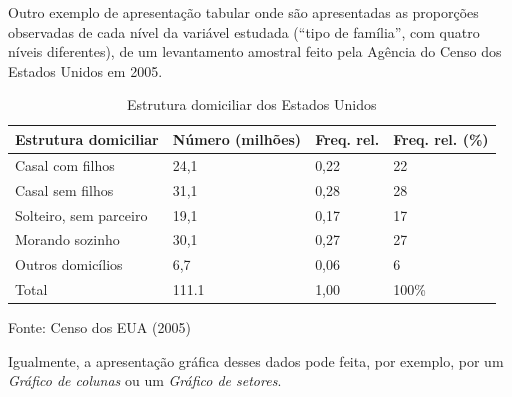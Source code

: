\documentclass[
]{book}
\begin{document}
\hfill\break

Outro exemplo de apresentação tabular onde são apresentadas as proporções observadas de cada nível da variável estudada (``tipo de família'', com quatro níveis diferentes), de um levantamento amostral feito pela Agência do Censo dos Estados Unidos em 2005.

\hfill\break

\begin{table}[h]
\centering
\caption{Estrutura domiciliar dos Estados Unidos}
\begin{tabular}{|l|l|l|l|}
\hline
Estrutura domiciliar   & Número (milhões)  & Freq. rel.  & Freq. rel.  (\%) \\
\hline
Casal com filhos       & 24,1             & 0,22       & 22               \\
Casal sem filhos       & 31,1             & 0,28       & 28               \\
Solteiro, sem parceiro & 19,1             & 0,17       & 17               \\
Morando sozinho        & 30,1             & 0,27       & 27               \\
Outros domicílios      & 6,7              & 0,06       & 6                \\
\hline
Total                  & 111.1            & 1,00       & 100\%            \\
\hline
\end{tabular}
\vspace{4pt}
Fonte: Censo dos EUA (2005)                                                
\end{table} 

\hfill\break

Igualmente, a apresentação gráfica desses dados pode feita, por exemplo, por um \emph{Gráfico de colunas} ou um \emph{Gráfico de setores}.

\hfill\break
\end{document}
